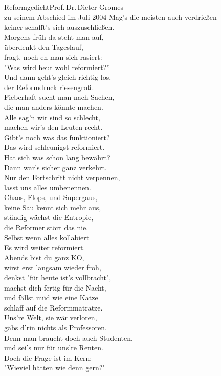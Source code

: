 \begin{lied*}{Reformgedicht}{Prof.\,Dr.\,Dieter Gromes\\zu seinem Abschied im Juli 2004}
Mag's die meisten auch verdrießen\\
keiner schafft's sich auszuschließen.\\
Morgens früh da steht man auf,\\
überdenkt den Tageslauf,\\
fragt, noch eh man sich rasiert:\\
"Was wird heut wohl reformiert?''\\

Und dann geht's gleich richtig los,\\
der Reformdruck riesengroß.\\
Fieberhaft sucht man nach Sachen,\\
die man anders könnte machen.\\
Alle sag'n wir sind so schlecht,\\
machen wir's den Leuten recht.\\
Gibt's noch was das funktioniert?\\
Das wird schleunigst reformiert.\\
Hat sich was schon lang bewährt?\\
Dann war's sicher ganz verkehrt.\\

Nur den Fortschritt nicht verpennen,\\
lasst uns alles umbenennen.\\
Chaos, Flops, und Supergaus,\\
keine Sau kennt sich mehr aus,\\
ständig wächst die Entropie,\\
die Reformer stört das nie.\\
Selbst wenn alles kollabiert\\
Es wird weiter reformiert.\\

Abends bist du ganz KO,\\
wirst erst langsam wieder froh,\\
denkst "für heute ist's vollbracht",\\
machst dich fertig für die Nacht,\\
und fällst müd wie eine Katze\\
schlaff auf die Reformmatratze.\\

Uns're Welt, sie wär verloren,\\
gäbs d'rin nichts als Professoren.\\
Denn man braucht doch auch Studenten,\\
und sei's nur für uns're Renten.\\
Doch die Frage ist im Kern:\\
"Wieviel hätten wie denn gern?"\\


\end{lied*}
